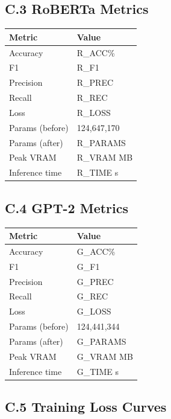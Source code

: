 \subsection{C.3 RoBERTa Metrics}

\begin{table}[H]
\centering
\small
\begin{tabular}{ll}
\toprule
\textbf{Metric} & \textbf{Value} \\
\midrule
Accuracy & {{R\_ACC}}\% \\
F1 & {{R\_F1}} \\
Precision & {{R\_PREC}} \\
Recall & {{R\_REC}} \\
Loss & {{R\_LOSS}} \\
Params (before) & 124,647,170 \\
Params (after) & {{R\_PARAMS}} \\
Peak VRAM & {{R\_VRAM}} MB \\
Inference time & {{R\_TIME}} s \\
\bottomrule
\end{tabular}
\end{table}

\subsection{C.4 GPT-2 Metrics}

\begin{table}[H]
\centering
\small
\begin{tabular}{ll}
\toprule
\textbf{Metric} & \textbf{Value} \\
\midrule
Accuracy & {{G\_ACC}}\% \\
F1 & {{G\_F1}} \\
Precision & {{G\_PREC}} \\
Recall & {{G\_REC}} \\
Loss & {{G\_LOSS}} \\
Params (before) & 124,441,344 \\
Params (after) & {{G\_PARAMS}} \\
Peak VRAM & {{G\_VRAM}} MB \\
Inference time & {{G\_TIME}} s \\
\bottomrule
\end{tabular}
\end{table}

\subsection{C.5 Training Loss Curves}

